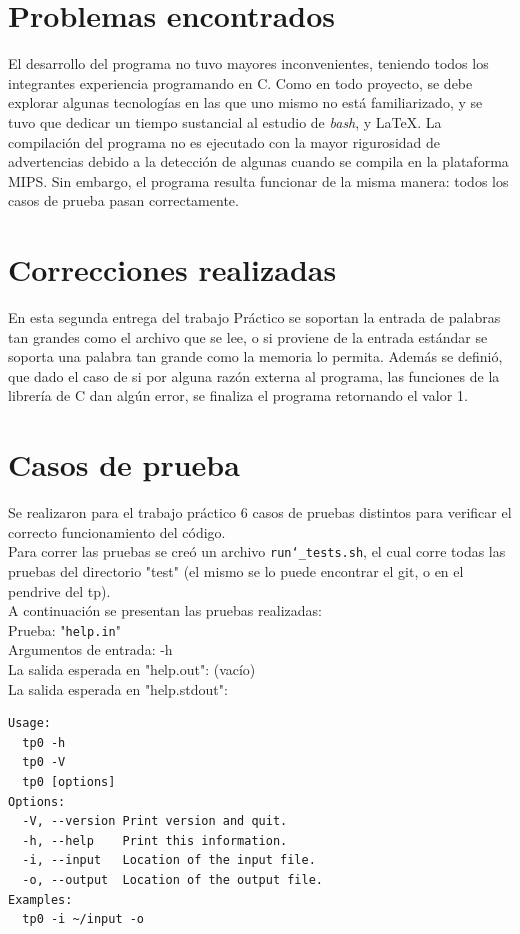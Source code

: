 \documentclass[a4paper,10pt]{article}
\begin{document}
    \section{Problemas encontrados}
El desarrollo del programa no tuvo mayores inconvenientes, teniendo todos los integrantes experiencia programando en C. Como en todo proyecto, se debe explorar algunas tecnologías en las que uno mismo no está familiarizado, y se tuvo que dedicar un tiempo sustancial al estudio de \textit{bash}, y \LaTeX. La compilación del programa no es ejecutado con la mayor rigurosidad de advertencias debido a la detección de algunas cuando se compila en la plataforma MIPS. Sin embargo, el programa resulta funcionar de la misma manera: todos los casos de prueba pasan correctamente.

  \section{Correcciones realizadas}
  En esta segunda entrega del trabajo Práctico se soportan la entrada de palabras tan grandes como el archivo que se lee, o si proviene de la entrada estándar se soporta una palabra tan grande como la memoria lo permita.
  Además se definió, que dado el caso de si por alguna razón externa al programa, las funciones de la librería de C dan algún error, se finaliza el programa retornando el valor 1.
    \section{Casos de prueba}
Se realizaron para el trabajo práctico 6 casos de pruebas distintos para verificar el correcto funcionamiento del código.\\
Para correr las pruebas se creó un archivo \texttt{run\char`_tests.sh}, el cual corre todas las pruebas del directorio "test" (el mismo se lo puede encontrar el git, o en el pendrive del tp).\\
A continuación se presentan las pruebas realizadas:\\

Prueba: "\texttt{help.in}" \\
    Argumentos de entrada: -h\\
    La salida esperada en "help.out": (vacío)\\
    La salida esperada en "help.stdout":
        \begin{Verbatim}
Usage:
  tp0 -h
  tp0 -V
  tp0 [options]
Options:
  -V, --version Print version and quit.
  -h, --help    Print this information.
  -i, --input   Location of the input file.
  -o, --output  Location of the output file.
Examples:
  tp0 -i ~/input -o
  \end{Verbatim}
      
\end{document}
